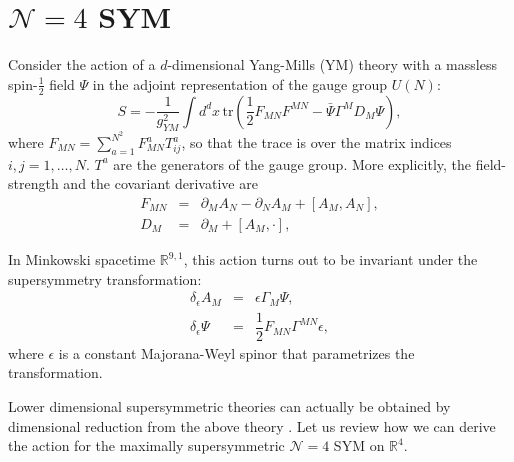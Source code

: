 \chapter{$\mathcal{N} = 4$ SYM}

Consider the action of a $d$-dimensional Yang-Mills (YM) theory 
with a massless spin-$\frac{1}{2}$ field $\Psi$ in the adjoint representation of the gauge group $U(N)$:
\begin{equation}
 S = - \dfrac{1}{g_{YM}^2} \int d^d x \, \text{tr}
     \left(
         \dfrac{1}{2}F_{M N}F^{M N}
       - \bar{\Psi} \Gamma^M D_M \Psi 
     \right),    
\end{equation}
where $F_{M N} =\sum_{a=1}^{N^2} F_{M N}^a T^a_{ij}$, so that the trace is over the matrix indices $i, j=1, \ldots, N$. 
$T^a$ are the generators of the gauge group.
More explicitly, the field-strength and the covariant derivative are
\begin{eqnarray}
 F_{MN} &=& \partial_M A_N - \partial_N A_M + [A_M, A_N],\\
 D_M &=& \partial_M  + [A_M, \cdot],
\end{eqnarray}



In Minkowski spacetime $\mathbb{R}^{9,1}$, 
this action turns out to be invariant under the supersymmetry transformation:
\begin{eqnarray}
 \delta_\epsilon A_M  & = & \epsilon \Gamma_M \Psi,\\
 \delta_\epsilon \Psi & = & \dfrac{1}{2} F_{M N} \Gamma^{M N} \epsilon,
\end{eqnarray}
where $\epsilon$ is a constant Majorana-Weyl spinor that parametrizes the transformation.

 
Lower dimensional supersymmetric theories can actually be obtained by 
dimensional reduction from the above theory \cite{Brink:1976bc}. 
Let us review how we can derive the action for the maximally supersymmetric
$\mathcal{N}=4$ SYM on $\mathbb{R}^{4}$.

